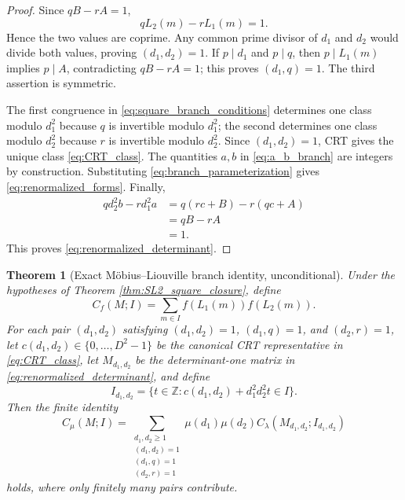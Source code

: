 \documentclass[11pt]{amsart}
\numberwithin{equation}{section}
\theoremstyle{plain}
\newtheorem{theorem}{Theorem}[section]
\theoremstyle{definition}
\theoremstyle{remark}
\newcommand{\Z}{\mathbb Z}
\newcommand{\mob}{\mu}
\newcommand{\liou}{\lambda}
\begin{document}
\begin{proof}
Since $qB-rA=1$,
\begin{equation}
qL_2(m)-rL_1(m)=1.
\label{eq:branch_bezout}
\end{equation}
Hence the two values are coprime.  Any common prime divisor of $d_1$ and $d_2$ would divide both values, proving $(d_1,d_2)=1$.  If $p\mid d_1$ and $p\mid q$, then $p\mid L_1(m)$ implies $p\mid A$, contradicting $qB-rA=1$; this proves $(d_1,q)=1$.  The third assertion is symmetric.

The first congruence in \eqref{eq:square_branch_conditions} determines one class modulo $d_1^2$ because $q$ is invertible modulo $d_1^2$; the second determines one class modulo $d_2^2$ because $r$ is invertible modulo $d_2^2$.  Since $(d_1,d_2)=1$, CRT gives the unique class \eqref{eq:CRT_class}.  The quantities $a,b$ in \eqref{eq:a_b_branch} are integers by construction.  Substituting \eqref{eq:branch_parameterization} gives \eqref{eq:renormalized_forms}.  Finally,
\begin{align}
qd_2^2b-rd_1^2a
&=q(rc+B)-r(qc+A)
\label{eq:determinant_branch_first}\\
&=qB-rA
\label{eq:determinant_branch_second}\\
&=1.
\label{eq:determinant_branch_final}
\end{align}
This proves \eqref{eq:renormalized_determinant}.
\end{proof}

\begin{theorem}[Exact Möbius--Liouville branch identity, unconditional]
\label{thm:exact_branch_identity}
Under the hypotheses of Theorem \ref{thm:SL2_square_closure}, define
\begin{equation}
C_f(M;I)=\sum_{m\in I}f(L_1(m))f(L_2(m)).
\label{eq:Cf_definition}
\end{equation}
For each pair $(d_1,d_2)$ satisfying $(d_1,d_2)=1$, $(d_1,q)=1$, and $(d_2,r)=1$, let $c(d_1,d_2)\in\{0,\ldots,D^2-1\}$ be the canonical CRT representative in \eqref{eq:CRT_class}, let $M_{d_1,d_2}$ be the determinant-one matrix in \eqref{eq:renormalized_determinant}, and define
\begin{equation}
I_{d_1,d_2}
=\{t\in\Z:c(d_1,d_2)+d_1^2d_2^2t\in I\}.
\label{eq:branch_interval}
\end{equation}
Then the finite identity
\begin{equation}
C_{\mob}(M;I)
=
\sum_{\substack{d_1,d_2\ge1\\(d_1,d_2)=1\\(d_1,q)=1\\(d_2,r)=1}}
\mob(d_1)\mob(d_2)
C_{\liou}(M_{d_1,d_2};I_{d_1,d_2})
\label{eq:exact_mu_lambda_branch_identity}
\end{equation}
holds, where only finitely many pairs contribute.
\end{theorem}
\end{document}
